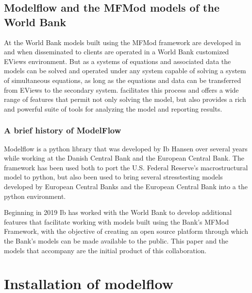 \documentclass[letterpaper,10pt,english]{jupyterBook}
\begin{document}
\chapter{Modelflow and the MFMod models of the World Bank}
\label{\detokenize{content/02_MacrostructuralModels/MFModAndModelFlow:modelflow-and-the-mfmod-models-of-the-world-bank}}\label{\detokenize{content/02_MacrostructuralModels/MFModAndModelFlow::doc}}
\sphinxAtStartPar
At the World Bank models built using the MFMod framework are developed in  and when disseminated to clients are operated in a World Bank customized EViews environment. But as a systems of equations and associated data the models can be solved and operated under any system capable of solving a system of simultaneous equations, as long as the equations and data can be transferred from EViews to the secondary system.  facilitates this process and offers a wide range of features that permit not only solving the model, but also provides a rich and powerful suite of tools for analyzing the model and reporting results.


\section{A brief history of ModelFlow}
\label{\detokenize{content/02_MacrostructuralModels/MFModAndModelFlow:a-brief-history-of-modelflow}}
\sphinxAtStartPar
Modelflow is a python library that was developed by Ib Hansen over several years while working at the Danish Central Bank and the European Central Bank. The framework has been used both to port the U.S. Federal Reserve’s macro\sphinxhyphen{}structural  model to python, but also been used to bring several stress\sphinxhyphen{}testing models developed by European Central Banks and the European Central Bank into a the python environment.

\sphinxAtStartPar
Beginning in 2019 Ib has worked with the World Bank to develop additional features that facilitate working with models built using the Bank’s MFMod Framework, with the objective of creating an open source platform through which the Bank’s models can be made available to the public.  This paper and the models that accompany are the initial product of this collaboration.

\sphinxstepscope


\part{Installation of modelflow}
\end{document}
